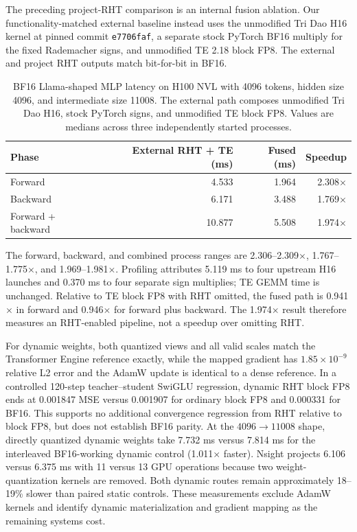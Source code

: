 \documentclass{article}
\begin{document}
The preceding project-RHT comparison is an internal fusion ablation. Our
functionality-matched external baseline instead uses the unmodified Tri Dao H16
kernel at pinned commit \texttt{e7706faf}, a separate stock PyTorch BF16
multiply for the fixed Rademacher signs, and unmodified TE 2.18 block FP8. The
external and project RHT outputs match bit-for-bit in BF16.

\begin{table}[t]
\caption{BF16 Llama-shaped MLP latency on H100 NVL with 4096 tokens, hidden
size 4096, and intermediate size 11008. The external path composes unmodified
Tri Dao H16, stock PyTorch signs, and unmodified TE block FP8. Values are
medians across three independently started processes.}
\label{tab:rht-external}
\centering
\small
\begin{tabular}{lrrr}
\toprule
Phase & External RHT + TE (ms) & Fused (ms) & Speedup \\
\midrule
Forward & 4.533 & 1.964 & 2.308$\times$ \\
Backward & 6.171 & 3.488 & 1.769$\times$ \\
Forward + backward & 10.877 & 5.508 & 1.974$\times$ \\
\bottomrule
\end{tabular}
\end{table}

The forward, backward, and combined process ranges are 2.306--2.309$\times$,
1.767--1.775$\times$, and 1.969--1.981$\times$. Profiling attributes 5.119 ms
to four upstream H16 launches and 0.370 ms to four separate sign multiplies;
TE GEMM time is unchanged. Relative to TE block FP8 with RHT omitted, the fused
path is 0.941$\times$ in forward and 0.946$\times$ for forward plus backward.
The 1.974$\times$ result therefore measures an RHT-enabled pipeline, not a
speedup over omitting RHT.


For dynamic weights, both quantized views and all valid scales match the
Transformer Engine reference exactly, while the
mapped gradient has $1.85\times10^{-9}$ relative L2 error and the AdamW update
is identical to a dense reference. In a controlled 120-step teacher--student
SwiGLU regression, dynamic RHT block FP8 ends at 0.001847 MSE versus 0.001907
for ordinary block FP8 and 0.000331 for BF16. This supports no additional
convergence regression from RHT relative to block FP8, but does not establish
BF16 parity. At the $4096\rightarrow11008$ shape, directly quantized dynamic
weights take 7.732 ms versus 7.814 ms for the interleaved BF16-working dynamic
control (1.011$\times$ faster). Nsight projects 6.106 versus 6.375 ms with 11
versus 13 GPU operations because two weight-quantization kernels are removed.
Both dynamic routes remain approximately 18--19\% slower than paired static
controls. These measurements exclude AdamW kernels and identify dynamic
materialization and gradient mapping as the remaining systems cost.
\end{document}
